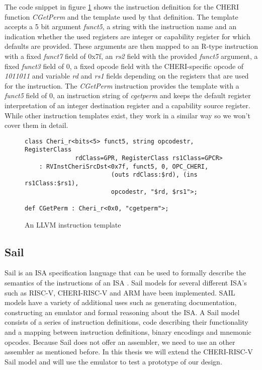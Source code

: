 The code snippet in figure \ref{fig:insttemplate} shows the instruction definition for the CHERI function \textit{CGetPerm} and the template used by that definition.
The template accepts a 5 bit argument \textit{funct5}, a string with the instruction name and an indication whether the used registers are integer or capability register for which defaults are provided.
These arguments are then mapped to an R-type instruction with a fixed \textit{funct7} field of 0x7f, an \textit{rs2} field with the provided \textit{funct5} argument, a fixed \textit{funct3} field of 0, a fixed opcode field with the CHERI-specific opcode of \textit{1011011} and variable \textit{rd} and \textit{rs1} fields depending on the registers that are used for the instruction.
The \textit{CGetPerm} instruction provides the template with a \textit{funct5} field of 0, an instruction string of \textit{cgetperm} and keeps the default register interpretation of an integer destination register and a capability source register.
While other instruction templates exist, they work in a similar way so we won't cover them in detail.

\begin{figure}[h]
\begin{verbatim}
class Cheri_r<bits<5> funct5, string opcodestr, RegisterClass
              rdClass=GPR, RegisterClass rs1Class=GPCR>
    : RVInstCheriSrcDst<0x7f, funct5, 0, OPC_CHERI,
                        (outs rdClass:$rd), (ins rs1Class:$rs1),
                        opcodestr, "$rd, $rs1">;

def CGetPerm : Cheri_r<0x0, "cgetperm">;
\end{verbatim}
\caption{An LLVM instruction template}
\label{fig:insttemplate}
\end{figure}

\subsection{Sail}
Sail is an ISA specification language that can be used to formally describe the semantics of the instructions of an ISA \cite{10.1145/3290384}. Sail models for several different ISA's such as RISC-V, CHERI-RISC-V and ARM have been implemented. SAIL models have a variety of additional uses such as generating documentation, constructing an emulator and formal reasoning about the ISA.
A Sail model consists of a series of instruction definitions, code describing their functionality and a mapping between instruction definitions, binary encodings and mnemonic opcodes.
Because Sail does not offer an assembler, we need to use an other assembler as mentioned before.
In this thesis we will extend the CHERI-RISC-V Sail model and will use the emulator to test a prototype of our design.

